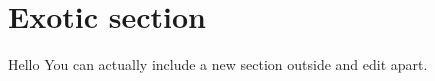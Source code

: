 \section[Outsider section]{Exotic section}

\begin{frame}{Hello}
    You can actually include a new section outside and edit apart.
\end{frame}